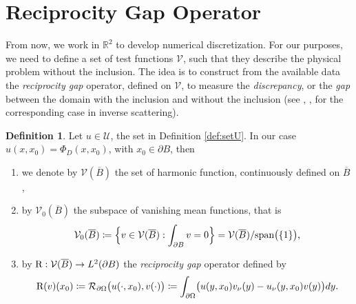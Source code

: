 \documentclass[10pt, a4paper, twoside, openright]{book}
\theoremstyle{definition}
\newtheorem{definition}[subsection]{Definition}
\theoremstyle{plain}
\theoremstyle{plain}
\theoremstyle{plain}
\theoremstyle{plain}
\theoremstyle{plain}
\theoremstyle{plain}
\theoremstyle{plain}
\theoremstyle{plain}
\begin{document}
\section{Reciprocity Gap Operator}
From now, we work in $\mathbb{R}^2$ to develop numerical discretization. 
For our purposes, we need to define a set of test functions $\mathcal{V}$, such that 
they describe the physical problem without the inclusion. The idea is to construct from the available 
data the \emph{reciprocity gap} operator, defined on $\mathcal{V}$, to measure the \emph{discrepancy}, or the \emph{gap} 
between the domain with the inclusion and without the inclusion 
(see \cite{colton-haddar:rg}, \cite{dicristo-sun:2006}, \cite{dicristo-sun:2007} 
for the corresponding case in inverse scattering).
\begin{definition}
\label{def:setV}
Let $u\in\mathcal{U}$, the set in Definition \ref{def:setU}. In our case $u(x,x_0)=\Phi_D(x,x_0)$, with $x_0 \in \partial B$, then
\begin{enumerate}
 \item we denote by $\mathcal{V}(\overline{B})$ the set of harmonic function, continuously defined on $\overline{B}$,
 \item by $\mathcal{V}_0(\overline{B})$ the subspace of vanishing mean functions, that is
 \begin{equation}
  \mathcal{V}_0(\overline{B})\coloneqq\Bigl\{v\in\mathcal{V}(\overline{B}):\int_{\partial B} v = 0\Bigr\}=\mathcal{V}(\overline{B})/\textup{span}\bigl(\{1\}\bigr),
 \end{equation}
 \item by $\textup{R} : \mathcal{V}(\overline{B})\to L^2(\partial B)$ the \emph{reciprocity gap} operator defined by
\begin{equation}
 \textup{R}(v)(x_0)\coloneqq \mathcal{R}_{\partial\Omega}\bigl(u(\cdot,x_0),v(\cdot)\bigr)\coloneqq \int_{\partial \Omega}\bigl(u(y,x_0)v_\nu (y) - u_\nu(y,x_0)v(y)\bigr)dy.
\end{equation}
\end{enumerate}
\end{definition}
\begin{figure}[]
\begin{center}
\end{center}
\end{figure}
\end{document}
